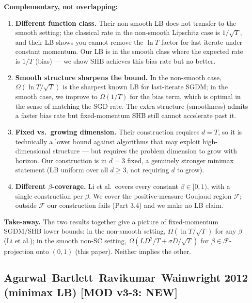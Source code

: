 \documentclass[11pt,a4paper]{article}
\theoremstyle{plain}
\theoremstyle{definition}
\theoremstyle{remark}
\newcommand{\F}{\mathcal{F}}
\begin{document}
\textbf{Complementary, not overlapping:}

\begin{enumerate}
\item \textbf{Different function class.} Their non-smooth LB does not transfer to the smooth setting; the classical rate in the non-smooth Lipschitz case is $1/\sqrt T$, and their LB shows you cannot remove the $\ln T$ factor for last iterate under constant momentum. Our LB is in the smooth class where the expected rate is $1/T$ (bias) --- we show SHB achieves this bias rate but no better.

\item \textbf{Smooth structure sharpens the bound.} In the non-smooth case, $\Omega(\ln T / \sqrt T)$ is the sharpest known LB for last-iterate SGDM; in the smooth case, we improve to $\Omega(1/T)$ for the bias term, which is optimal in the sense of matching the SGD rate. The extra structure (smoothness) admits a faster bias rate but fixed-momentum SHB still cannot accelerate past it.

\item \textbf{Fixed vs.\ growing dimension.} Their construction requires $d = T$, so it is technically a lower bound against algorithms that may exploit high-dimensional structure --- but requires the problem dimension to grow with horizon. Our construction is in $d = 3$ fixed, a genuinely stronger minimax statement (LB uniform over all $d \geq 3$, not requiring $d$ to grow).

\item \textbf{Different $\beta$-coverage.} Li et al.\ covers every constant $\beta \in [0,1)$, with a single construction per $\beta$. We cover the positive-measure Goujaud region $\F$; outside $\F$ our construction fails (Part 3.4) and we make no LB claim.
\end{enumerate}

\textbf{Take-away.} The two results together give a picture of fixed-momentum SGDM/SHB lower bounds: in the non-smooth setting, $\Omega(\ln T/\sqrt T)$ for any $\beta$ (Li et al.); in the smooth non-SC setting, $\Omega(LD^2/T + \sigma D/\sqrt T)$ for $\beta \in \F$-projection onto $(0,1)$ (this paper). Neither implies the other.

\subsection{Agarwal--Bartlett--Ravikumar--Wainwright 2012 (minimax LB) \textbf{[MOD v3-3: NEW]}}
\end{document}
